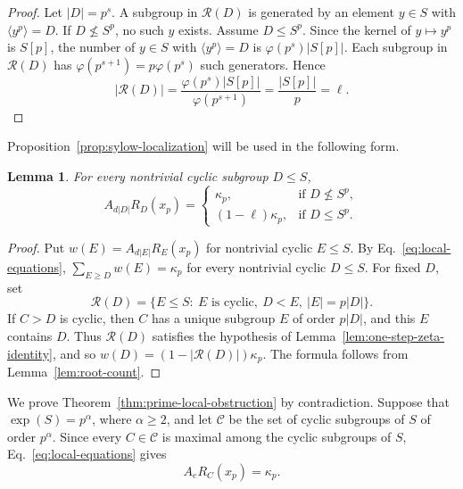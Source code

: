 \documentclass[11pt]{article}
\newtheorem{lemma}[theorem]{Lemma}
\theoremstyle{definition}
\begin{document}
\begin{proof}
	Let \(|D|=p^s\).  A subgroup in \(\mathcal R(D)\) is generated by an element
	\(y\in S\) with \(\langle y^p\rangle=D\).  If \(D\nleq S^p\), no such \(y\)
	exists.  Assume \(D\le S^p\).  Since the kernel of \(y\mapsto y^p\) is \(S[p]\),
	the number of \(y\in S\) with \(\langle y^p\rangle=D\) is
	\(\varphi(p^s)|S[p]|\).  Each subgroup in \(\mathcal R(D)\) has
	\(\varphi(p^{s+1})=p\varphi(p^s)\) such generators.  Hence
	\[
	|\mathcal R(D)|
	=
	\frac{\varphi(p^s)|S[p]|}{\varphi(p^{s+1})}
	=
	\frac{|S[p]|}{p}
	=
	\ell.
	\]
\end{proof}

Proposition~\ref{prop:sylow-localization} will be used in the following form.

\begin{lemma}\label{lem:local-weight-identity}
	For every nontrivial cyclic subgroup \(D\le S\),
	\begin{equation}\label{eq:local-weight-identity}
		A_{d|D|}R_D(x_p)
		=
		\begin{cases}
			\kappa_p, & \text{if }D\nleq S^p,\\[1mm]
			(1-\ell)\kappa_p, & \text{if }D\le S^p.
		\end{cases}
	\end{equation}
\end{lemma}

\begin{proof}
	Put \(w(E)=A_{d|E|}R_E(x_p)\) for nontrivial cyclic \(E\le S\).  By
	Eq.~\eqref{eq:local-equations}, \(\sum_{E\ge D}w(E)=\kappa_p\) for every
	nontrivial cyclic \(D\le S\).  For fixed \(D\), set
	\[
	\mathcal R(D)=\{E\le S:\ E\text{ is cyclic},\ D<E,\ |E|=p|D|\}.
	\]
	If \(C>D\) is cyclic, then \(C\) has a unique subgroup \(E\) of order
	\(p|D|\), and this \(E\) contains \(D\).  Thus \(\mathcal R(D)\) satisfies the
	hypothesis of Lemma~\ref{lem:one-step-zeta-identity}, and so
	\(w(D)=(1-|\mathcal R(D)|)\kappa_p\).  The formula follows from
	Lemma~\ref{lem:root-count}.
\end{proof}


We prove Theorem~\ref{thm:prime-local-obstruction} by contradiction. Suppose that \(\exp(S)=p^\alpha\), where \(\alpha\ge2\), and let \(\mathcal C\) be the set of cyclic subgroups of $S$ of order $p^\alpha$. Since every \(C\in\mathcal C\) is maximal among the cyclic subgroups of $S$, Eq.~\eqref{eq:local-equations} gives
\begin{equation}\label{eq:top-order-value}
A_eR_C(x_p)=\kappa_p.
\end{equation}
\end{document}
